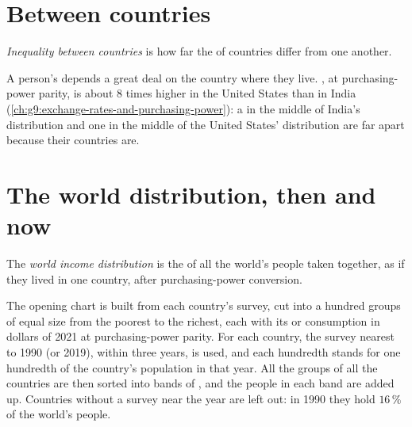 \section{Between countries}

\begin{definition}\label{def:g9:income-distribution:between}
\emph{Inequality between countries} is how far the  of
countries differ from one another.
\end{definition}

A person's  depends a great deal on the country where they live. , at
purchasing-power parity, is about 8 times higher in the United States than in India
(\cref{ch:g9:exchange-rates-and-purchasing-power}): a  in the middle of India's distribution and one
in the middle of the United States' distribution are far apart because their countries are.

\section{The world distribution, then and now}

\begin{definition}\label{def:g9:income-distribution:world-distribution}
The \emph{world income distribution} is the  of all the
world's people taken together, as if they lived in one country, after purchasing-power conversion.
\end{definition}

\begin{measure}
The opening chart is built from each country's  survey, cut into a hundred groups of equal size
from the poorest to the richest, each with its  or consumption in dollars of 2021 at
purchasing-power parity. For each country, the survey nearest to 1990 (or 2019), within three years, is
used, and each hundredth stands for one hundredth of the country's population in that year. All the groups
of all the countries are then sorted into bands of , and the people in each band are added up.
Countries without a survey near the year are left out: in 1990 they hold $16\,\%$ of the world's people.
\end{measure}

